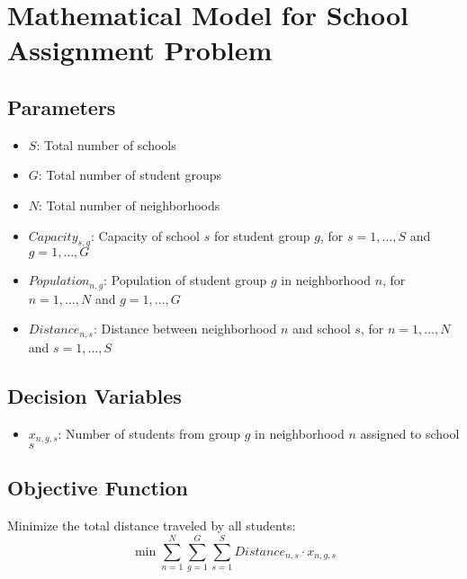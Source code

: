 \documentclass{article}
\begin{document}
\section*{Mathematical Model for School Assignment Problem}

\subsection*{Parameters}
\begin{itemize}
    \item $S$: Total number of schools
    \item $G$: Total number of student groups
    \item $N$: Total number of neighborhoods
    \item $Capacity_{s,g}$: Capacity of school $s$ for student group $g$, for $s = 1, \ldots, S$ and $g = 1, \ldots, G$
    \item $Population_{n,g}$: Population of student group $g$ in neighborhood $n$, for $n = 1, \ldots, N$ and $g = 1, \ldots, G$
    \item $Distance_{n,s}$: Distance between neighborhood $n$ and school $s$, for $n = 1, \ldots, N$ and $s = 1, \ldots, S$
\end{itemize}

\subsection*{Decision Variables}
\begin{itemize}
    \item $x_{n,g,s}$: Number of students from group $g$ in neighborhood $n$ assigned to school $s$
\end{itemize}

\subsection*{Objective Function}
Minimize the total distance traveled by all students:
\[
\min \sum_{n=1}^{N} \sum_{g=1}^{G} \sum_{s=1}^{S} Distance_{n,s} \cdot x_{n,g,s}
\]
\end{document}
